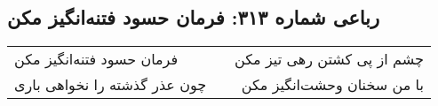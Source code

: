 \begin{center}
\section*{رباعی شماره ۳۱۳: فرمان حسود فتنه‌انگیز مکن}
\label{sec:sh313}
\begin{longtable}{l p{0.5cm} r}
فرمان حسود فتنه‌انگیز مکن
&&
چشم از پی کشتن رهی تیز مکن
\\
چون عذر گذشته را نخواهی باری
&&
با من سخنان وحشت‌انگیز مکن
\\
\end{longtable}
\end{center}
